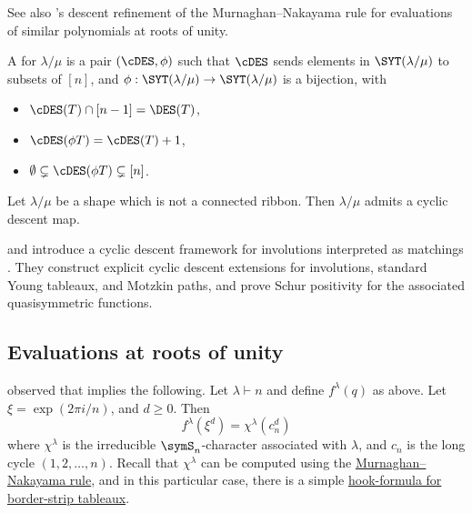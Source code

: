 See also 's descent refinement of the
Murnaghan--Nakayama rule \cite{Pfannerer2021RefinedMN} for evaluations of
similar polynomials at roots of unity.


\begin{definition}
 A \label{cyclicDescentMap} for $\lambda/\mu$ is a
 pair $(\cDES, \phi)$
 such that $\cDES$ sends elements in $\SYT(\lambda/\mu)$ to subsets of $[n]$,
 and $\phi : \SYT(\lambda/\mu) \to \SYT(\lambda/\mu)$ is a bijection, with
 \begin{itemize}
  \item $\cDES(T) \cap [n-1]  = \DES(T)$,
  \item $\cDES(\phi T) = \cDES(T) + 1$,
  \item $\emptyset \subsetneq \cDES(\phi T) \subsetneq [n]$.
 \end{itemize}
\end{definition}

\begin{lemma}
Let $\lambda/\mu$ be a shape which is not a connected ribbon.
Then $\lambda/\mu$ admits a cyclic descent map.
\end{lemma}

 and  introduce a cyclic descent
framework for involutions interpreted as matchings \cite{AdinRoichman2023}.
They construct explicit cyclic descent extensions for involutions, standard
Young tableaux, and Motzkin paths, and prove Schur positivity for the
associated quasisymmetric functions.





\subsection[prelimEvalAtRootsOfUnity]{Evaluations at roots of unity}





\begin{theorem}
 observed that \cite[Prop. 4.5]{Springer1974} implies the following.
Let $\lambda \vdash n$ and define $f^\lambda(q)$ as above. Let $\xi = \exp(2\pi i/n)$, and $d\geq 0$.
Then
\[
f^\lambda(\xi^d) = \chi^{\lambda}( c_n^d )
\]
where $\chi^{\lambda}$ is the irreducible $\symS_n$-character
associated with $\lambda$, and $c_n$ is the long cycle $(1,2,\dotsc,n)$.
Recall that $\chi^{\lambda}$ can be computed using the \hyperref[schurMurnaghanNakayama]{Murnaghan--Nakayama rule},
and in this particular case,
there is a simple \hyperref[borderStripTableaux]{hook-formula for border-strip tableaux}.
\end{theorem}


